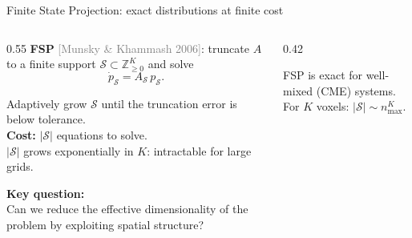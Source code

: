 \documentclass[10pt,aspectratio=169]{beamer}
\newcommand{\citeref}[1]{{\scriptsize\textcolor{gray}{[#1]}}}
\begin{document}
\begin{frame}{Finite State Projection: exact distributions at finite cost}

\begin{columns}[T]
\begin{column}{0.55\textwidth}
  \textbf{FSP} \citeref{Munsky \& Khammash 2006}: truncate $A$ to a finite support
  $\mathcal{S}\subset\mathbb{Z}_{\ge 0}^K$ and solve
  \[
    \dot{p}_{\mathcal{S}} = A_{\mathcal{S}}\,p_{\mathcal{S}}.
  \]

  \medskip
  Adaptively grow $\mathcal{S}$ until the truncation error is below tolerance.\\[0.8em]

  \textbf{Cost:} $|\mathcal{S}|$ equations to solve.\\[0.4em]
  $|\mathcal{S}|$ grows exponentially in $K$: intractable for large grids.

  \bigskip
  \textbf{Key question:}\\[0.3em]
  Can we reduce the effective dimensionality of the problem
  by exploiting spatial structure?
\end{column}
\begin{column}{0.42\textwidth}
  \centering

  \bigskip
  {\small FSP is exact for well-mixed (CME) systems.\\
  For $K$ voxels: $|\mathcal{S}| \sim n_{\max}^K$.}
\end{column}
\end{columns}
\end{frame}
\end{document}
